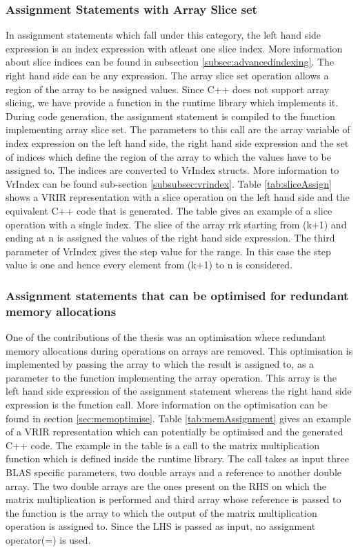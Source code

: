 \subsubsection{Assignment Statements with Array Slice set}
In assignment statements which fall under this category, the left hand side expression is an index expression with atleast one slice index. More information about slice indices can be found in subsection \ref{subsec:advancedindexing}. The right hand side can be any expression. The array slice set operation allows a region of the array to be assigned values. Since C++ does not support array slicing, we have provide a function in the runtime library which implements it. During code generation, the assignment statement is compiled to the function implementing array slice set. The parameters to this call are the array variable of index expression on the left hand side, the right hand side expression and the set of indices which define the region of the array to which the values have to be assigned to. The indices are converted to VrIndex structs. More information to VrIndex can be found sub-section \ref{subsubsec:vrindex}. Table \ref{tab:sliceAssign} shows a VRIR representation with a slice operation on the left hand side and the equivalent C++ code that is generated. The table gives an example of a slice operation with a single index. The slice of the array rrk starting from (k+1) and ending at n is assigned the values of the right hand side expression. The third parameter of VrIndex gives the step value for the range. In this case the step value is one and hence every element from (k+1)  to n is considered. 
\subsubsection{Assignment statements that can be optimised  for redundant memory allocations}
One of the contributions of the thesis was an optimisation where redundant memory allocations during operations on arrays are removed. This optimisation is implemented by passing the array to which the result is assigned to, as a parameter to the function implementing the array operation. This array is the left hand side expression of the assignment statement whereas the right hand side expression is the function call. More information on the optimisation can be found in section \ref{sec:memoptimise}. Table \ref{tab:memAssignment} gives an example of a VRIR representation which can potentially be optimised and the generated C++ code.  The example in the table is a call to the matrix multiplication function which is defined inside the runtime library. The call takes as input three BLAS specific parameters, two double arrays and a reference to another double array. The two double arrays are the ones present on the RHS on which the matrix multiplication is performed and third array whose reference is passed to the function is the array to which the output of the matrix multiplication operation is assigned to. Since the LHS is passed as input, no assignment operator(=) is used.

